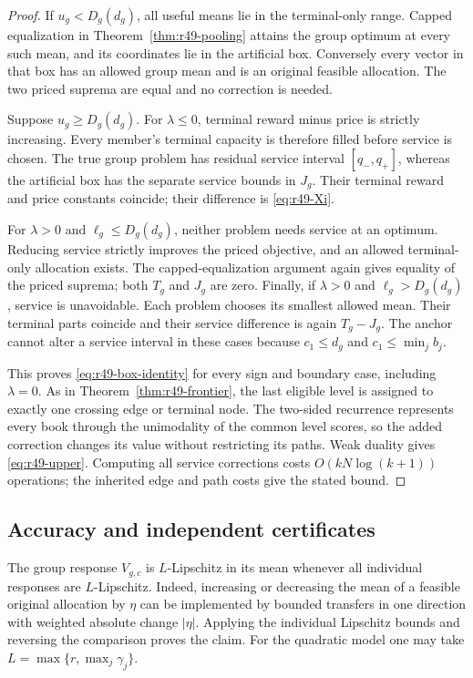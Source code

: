\begin{proof}
If $u_g<D_g(d_g)$, all useful means lie in the terminal-only range. Capped equalization in Theorem~\ref{thm:r49-pooling} attains the group optimum at every such mean, and its coordinates lie in the artificial box. Conversely every vector in that box has an allowed group mean and is an original feasible allocation. The two priced suprema are equal and no correction is needed.

Suppose $u_g\geq D_g(d_g)$. For $\lambda\leq0$, terminal reward minus price is strictly increasing. Every member's terminal capacity is therefore filled before service is chosen. The true group problem has residual service interval $[q_-,q_+]$, whereas the artificial box has the separate service bounds in $J_g$. Their terminal reward and price constants coincide; their difference is \eqref{eq:r49-Xi}.

For $\lambda>0$ and $\ell_g\leq D_g(d_g)$, neither problem needs service at an optimum. Reducing service strictly improves the priced objective, and an allowed terminal-only allocation exists. The capped-equalization argument again gives equality of the priced suprema; both $T_g$ and $J_g$ are zero. Finally, if $\lambda>0$ and $\ell_g>D_g(d_g)$, service is unavoidable. Each problem chooses its smallest allowed mean. Their terminal parts coincide and their service difference is again $T_g-J_g$. The anchor cannot alter a service interval in these cases because $c_1\leq d_g$ and $c_1\leq\min_jb_j$.

This proves \eqref{eq:r49-box-identity} for every sign and boundary case, including $\lambda=0$. As in Theorem~\ref{thm:r49-frontier}, the last eligible level is assigned to exactly one crossing edge or terminal node. The two-sided recurrence represents every book through the unimodality of the common level scores, so the added correction changes its value without restricting its paths. Weak duality gives \eqref{eq:r49-upper}. Computing all service corrections costs $O(kN\log(k+1))$ operations; the inherited edge and path costs give the stated bound.\end{proof}

\subsection{Accuracy and independent certificates}
The group response $V_{g,c}$ is $L$-Lipschitz in its mean whenever all individual responses are $L$-Lipschitz. Indeed, increasing or decreasing the mean of a feasible original allocation by $\eta$ can be implemented by bounded transfers in one direction with weighted absolute change $|\eta|$. Applying the individual Lipschitz bounds and reversing the comparison proves the claim. For the quadratic model one may take $L=\max\{r,\max_j\gamma_j\}$.


